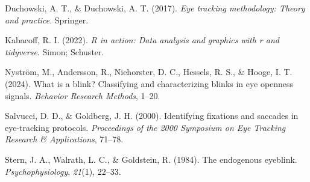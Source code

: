 \documentclass[
  man,
  floatsintext,
  longtable,
  nolmodern,
  notxfonts,
  notimes,
  colorlinks=true,linkcolor=blue,citecolor=blue,urlcolor=blue]{apa7}
\newlength{\cslhangindent}
\newenvironment{CSLReferences}[2] %
 {\begin{list}{}{%
  \setlength{\itemindent}{0pt}
  \setlength{\leftmargin}{0pt}
  \setlength{\parsep}{0pt}
  \ifodd #1
   \setlength{\leftmargin}{\cslhangindent}
   \setlength{\itemindent}{-1\cslhangindent}
  \fi
  \setlength{\itemsep}{#2\baselineskip}}}
 {\end{list}}
\begin{document}
\label{refs}
\begin{CSLReferences}{1}{0}
Duchowski, A. T., \& Duchowski, A. T. (2017). \emph{Eye tracking
methodology: Theory and practice}. Springer.

Kabacoff, R. I. (2022). \emph{R in action: Data analysis and graphics
with r and tidyverse}. Simon; Schuster.

Nyström, M., Andersson, R., Niehorster, D. C., Hessels, R. S., \& Hooge,
I. T. (2024). What is a blink? Classifying and characterizing blinks in
eye openness signals. \emph{Behavior Research Methods}, 1--20.

Salvucci, D. D., \& Goldberg, J. H. (2000). Identifying fixations and
saccades in eye-tracking protocols. \emph{Proceedings of the 2000
Symposium on Eye Tracking Research \& Applications}, 71--78.

Stern, J. A., Walrath, L. C., \& Goldstein, R. (1984). The endogenous
eyeblink. \emph{Psychophysiology}, \emph{21}(1), 22--33.

\end{CSLReferences}
\end{document}
